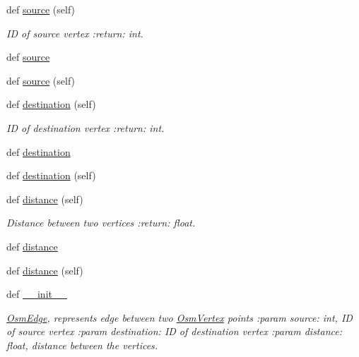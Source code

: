 \begin{DoxyCompactItemize}
\item 
def \mbox{\hyperlink{classbridges_1_1data__src__dependent_1_1osm_1_1_osm_edge_a52c735a9496d74764fbcf29805d4f372}{source}} (self)
\begin{DoxyCompactList}\small\item\em ID of source vertex \+:return\+: int. \end{DoxyCompactList}\item 
def \mbox{\hyperlink{classbridges_1_1data__src__dependent_1_1osm_1_1_osm_edge_a7e91ba375c45e21b3364f84d3415384d}{source}}
\item 
def \mbox{\hyperlink{classbridges_1_1data__src__dependent_1_1osm_1_1_osm_edge_a52c735a9496d74764fbcf29805d4f372}{source}} (self)
\item 
def \mbox{\hyperlink{classbridges_1_1data__src__dependent_1_1osm_1_1_osm_edge_ac3e5f99dd826c60fba46a5db69ee4b12}{destination}} (self)
\begin{DoxyCompactList}\small\item\em ID of destination vertex \+:return\+: int. \end{DoxyCompactList}\item 
def \mbox{\hyperlink{classbridges_1_1data__src__dependent_1_1osm_1_1_osm_edge_a985f37861dec03b102c0230259a27e50}{destination}}
\item 
def \mbox{\hyperlink{classbridges_1_1data__src__dependent_1_1osm_1_1_osm_edge_ac3e5f99dd826c60fba46a5db69ee4b12}{destination}} (self)
\item 
def \mbox{\hyperlink{classbridges_1_1data__src__dependent_1_1osm_1_1_osm_edge_ae20fb44608780d4f10f55c1a85e4d410}{distance}} (self)
\begin{DoxyCompactList}\small\item\em Distance between two vertices \+:return\+: float. \end{DoxyCompactList}\item 
def \mbox{\hyperlink{classbridges_1_1data__src__dependent_1_1osm_1_1_osm_edge_aa3931845de062f70bae375a389a9262d}{distance}}
\item 
def \mbox{\hyperlink{classbridges_1_1data__src__dependent_1_1osm_1_1_osm_edge_ae20fb44608780d4f10f55c1a85e4d410}{distance}} (self)
\item 
def \mbox{\hyperlink{classbridges_1_1data__src__dependent_1_1osm_1_1_osm_edge_ac0f57be58220744c49bffc353d73db6f}{\+\_\+\+\_\+init\+\_\+\+\_\+}}
\begin{DoxyCompactList}\small\item\em \mbox{\hyperlink{classbridges_1_1data__src__dependent_1_1osm_1_1_osm_edge}{Osm\+Edge}}, represents edge between two \mbox{\hyperlink{classbridges_1_1data__src__dependent_1_1osm_1_1_osm_vertex}{Osm\+Vertex}} points \+:param source\+: int, ID of source vertex \+:param destination\+: ID of destination vertex \+:param distance\+: float, distance between the vertices. \end{DoxyCompactList}\end{DoxyCompactItemize}
